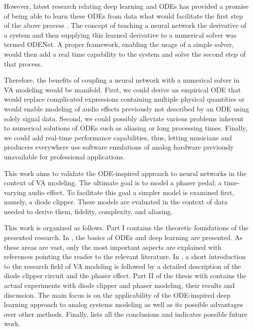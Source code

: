 However, latest research relating deep learning and \acp{ODE} has provided a promise of being able to learn these \acp{ODE} from data what would facilitate the first step of the above process \cite{Chen2018}. The concept of teaching a neural network the derivative of a system and then supplying this learned derivative to a numerical solver was termed ODENet. A proper framework, enabling the usage of a simple solver, would then add a real time capability to the system and solve the second step of that process.

Therefore, the benefits of coupling a neural network with a numerical solver in \ac{VA} modeling would be manifold. First, we could derive an empirical \ac{ODE} that would replace complicated expressions containing multiple physical quantities or would enable modeling of audio effects previously not described by an \ac{ODE} using solely signal data. Second, we could possibly alleviate various problems inherent to numerical solutions of \acp{ODE} such as aliasing or long processing times. Finally, we could add real-time performance capabilities, thus, letting musicians and producers everywhere use software emulations of analog hardware previously unavailable for professional applications.

This work aims to validate the \ac{ODE}-inspired approach to neural networks in the context of \ac{VA} modeling. The ultimate goal is to model a phaser pedal; a time-varying audio effect. To facilitate this goal a simpler model is examined first, namely, a diode clipper. These models are evaluated in the context of data needed to derive them, fidelity, complexity, and aliasing.

This work is organized as follows. Part I contains the theoretic foundations of the presented research. In , the basics of \acp{ODE} and deep learning are presented. As these areas are vast, only the most important aspects are explained with references pointing the reader to the relevant literature. In , a short introduction to the research field of \ac{VA} modeling is followed by a detailed description of the diode clipper circuit and the phaser effect. Part II of the thesis with  contains the actual experiments with diode clipper and phaser modeling, their results and discussion. The main focus is on the applicability of the \ac{ODE}-inspired deep learning approach to analog systems modeling as well as its possible advantages over other methods. Finally,  lists all the conclusions and indicates possible future work.

